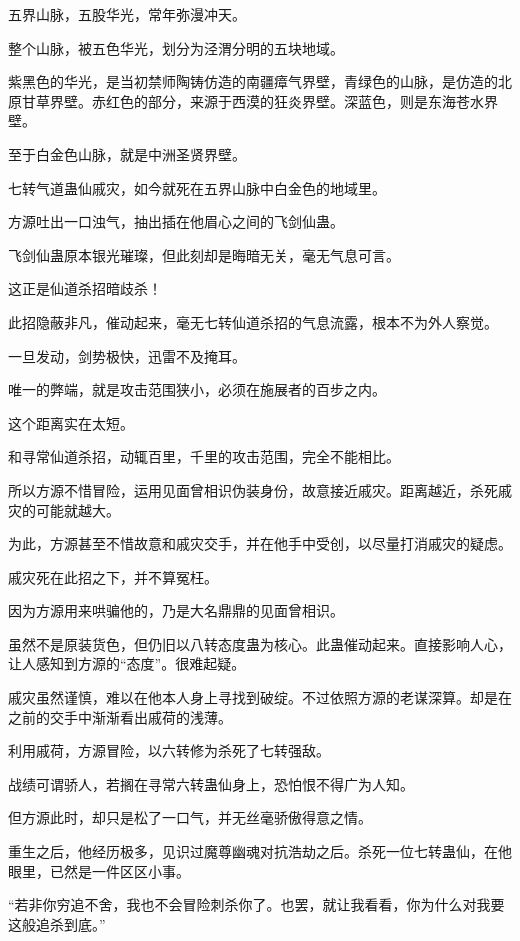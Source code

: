 
\begin{this_body}

五界山脉，五股华光，常年弥漫冲天。

整个山脉，被五色华光，划分为泾渭分明的五块地域。

紫黑色的华光，是当初禁师陶铸仿造的南疆瘴气界壁，青绿色的山脉，是仿造的北原甘草界壁。赤红色的部分，来源于西漠的狂炎界壁。深蓝色，则是东海苍水界壁。

至于白金色山脉，就是中洲圣贤界壁。

七转气道蛊仙戚灾，如今就死在五界山脉中白金色的地域里。

方源吐出一口浊气，抽出插在他眉心之间的飞剑仙蛊。

飞剑仙蛊原本银光璀璨，但此刻却是晦暗无关，毫无气息可言。

这正是仙道杀招暗歧杀！

此招隐蔽非凡，催动起来，毫无七转仙道杀招的气息流露，根本不为外人察觉。

一旦发动，剑势极快，迅雷不及掩耳。

唯一的弊端，就是攻击范围狭小，必须在施展者的百步之内。

这个距离实在太短。

和寻常仙道杀招，动辄百里，千里的攻击范围，完全不能相比。

所以方源不惜冒险，运用见面曾相识伪装身份，故意接近戚灾。距离越近，杀死戚灾的可能就越大。

为此，方源甚至不惜故意和戚灾交手，并在他手中受创，以尽量打消戚灾的疑虑。

戚灾死在此招之下，并不算冤枉。

因为方源用来哄骗他的，乃是大名鼎鼎的见面曾相识。

虽然不是原装货色，但仍旧以八转态度蛊为核心。此蛊催动起来。直接影响人心，让人感知到方源的“态度”。很难起疑。

戚灾虽然谨慎，难以在他本人身上寻找到破绽。不过依照方源的老谋深算。却是在之前的交手中渐渐看出戚荷的浅薄。

利用戚荷，方源冒险，以六转修为杀死了七转强敌。

战绩可谓骄人，若搁在寻常六转蛊仙身上，恐怕恨不得广为人知。

但方源此时，却只是松了一口气，并无丝毫骄傲得意之情。

重生之后，他经历极多，见识过魔尊幽魂对抗浩劫之后。杀死一位七转蛊仙，在他眼里，已然是一件区区小事。

“若非你穷追不舍，我也不会冒险刺杀你了。也罢，就让我看看，你为什么对我要这般追杀到底。”


\end{this_body}
